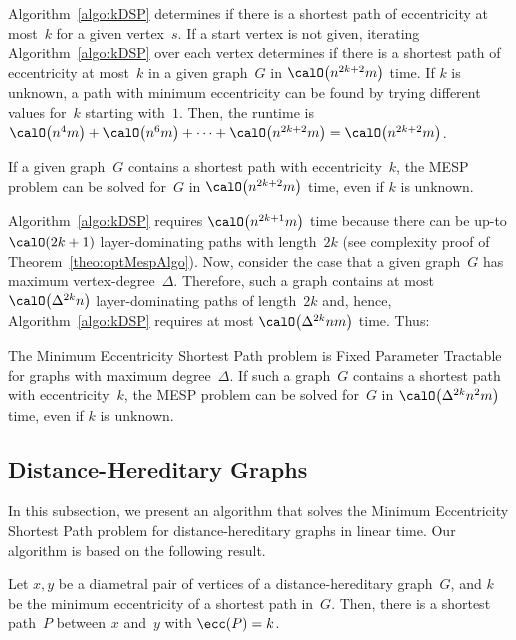 Algorithm~\ref{algo:kDSP} determines if there is a shortest path of eccentricity at most~$k$ for a given vertex~$s$.
If a start vertex is not given, iterating Algorithm~\ref{algo:kDSP} over each vertex determines if there is a shortest path of eccentricity at most~$k$ in a given graph~$G$ in $\calO \big( n^{2k+2} m \big)$ time.
If $k$ is unknown, a path with minimum eccentricity can be found by trying different values for~$k$ starting with~$1$.
Then, the runtime is $\calO \big( n^4 m \big) + \calO \big( n^6 m \big) + \cdots + \calO \big( n^{2k+2} m \big) = \calO \big( n^{2k+2} m \big)$.

\begin{corollary}
If a given graph~\( G \) contains a shortest path with eccentricity~\( k \), the MESP problem can be solved for~\( G \) in \( \calO \big( n^{2k+2} m \big) \) time, even if \( k \) is unknown.
\end{corollary}

Algorithm~\ref{algo:kDSP} requires $\calO \big( n^{2k + 1} m \big)$ time because there can be up-to $\calO(2k + 1)$ layer-dominating paths with length~$2k$ (see complexity proof of Theorem~\ref{theo:optMespAlgo}).
Now, consider the case that a given graph~$G$ has maximum vertex-degree~$\Delta$.
Therefore, such a graph contains at most $\calO \big( \Delta^{2k} n \big)$ layer-dominating paths of length~$2k$ and, hence, Algorithm~\ref{algo:kDSP} requires at most $\calO \big( \Delta^{2k} nm \big)$ time.
Thus:

\begin{corollary}
    \label{cor:FPTBoundDegree}
The Minimum Eccentricity Shortest Path problem is Fixed Parameter Tractable for graphs with maximum degree~$\Delta$.
If such a graph~\( G \) contains a shortest path with eccentricity~\( k \), the MESP problem can be solved for~\( G \) in \( \calO \big( \Delta^{2k} n^2m \big) \) time, even if \( k \) is unknown.
\end{corollary}


\subsection{Distance-Hereditary Graphs}

In this subsection, we present an algorithm that solves the Minimum Eccentricity Shortest Path problem for distance-hereditary graphs in linear time.
Our algorithm is based on the following result.

\begin{theorem}
    \label{theo:mespDistHereDiameter}
Let \( x, y \) be a diametral pair of vertices of a distance-hereditary graph~\( G \), and \( k \) be the minimum eccentricity of a shortest path in~\( G \).
Then, there is a shortest path~\( P \) between \( x \) and~\( y \) with \( \ecc(P) = k \).
\end{theorem}

